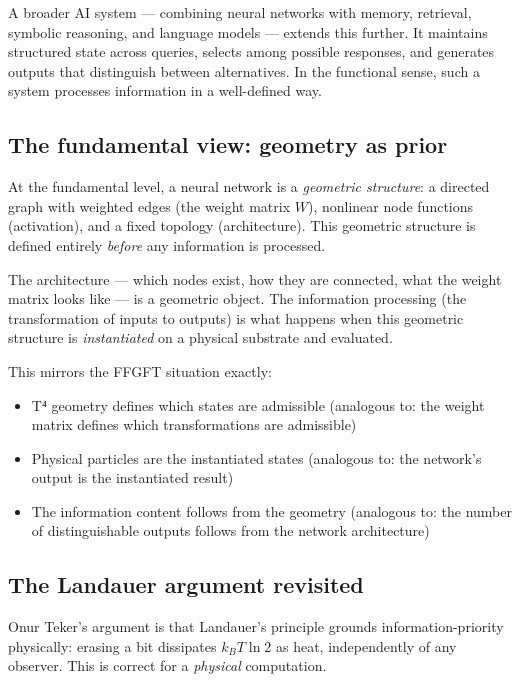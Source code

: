 A broader AI system --- combining neural networks with memory,
retrieval, symbolic reasoning, and language models --- extends this
further. It maintains structured state across queries, selects among
possible responses, and generates outputs that distinguish between
alternatives. In the functional sense, such a system processes
information in a well-defined way.

\subsection{The fundamental view: geometry as prior}

At the fundamental level, a neural network is a \emph{geometric
structure}: a directed graph with weighted edges (the weight matrix
$W$), nonlinear node functions (activation), and a fixed topology
(architecture). This geometric structure is defined entirely
\emph{before} any information is processed.

The architecture --- which nodes exist, how they are connected, what
the weight matrix looks like --- is a geometric object. The
information processing (the transformation of inputs to outputs) is
what happens when this geometric structure is \emph{instantiated} on
a physical substrate and evaluated.

This mirrors the FFGFT situation exactly:
\begin{itemize}
  \item T⁴ geometry defines which states are admissible
        (analogous to: the weight matrix defines which transformations
        are admissible)
  \item Physical particles are the instantiated states
        (analogous to: the network's output is the instantiated result)
  \item The information content follows from the geometry
        (analogous to: the number of distinguishable outputs follows
        from the network architecture)
\end{itemize}

\subsection{The Landauer argument revisited}

Onur Teker's argument is that Landauer's principle grounds
information-priority physically: erasing a bit dissipates $k_B T \ln 2$
as heat, independently of any observer. This is correct for a
\emph{physical} computation.

